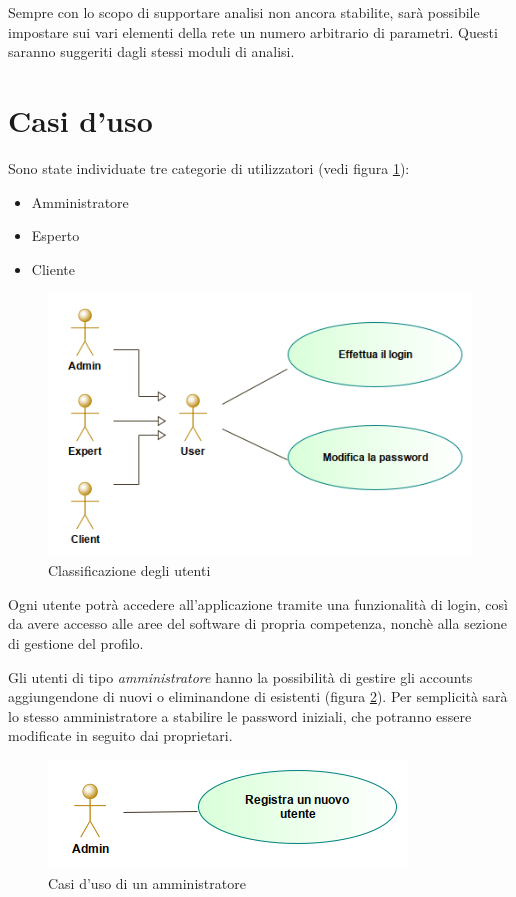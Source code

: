 Sempre con lo scopo di supportare analisi non ancora stabilite, sarà possibile impostare sui vari elementi della rete un numero arbitrario di parametri.
Questi saranno suggeriti dagli stessi moduli di analisi.


\section{Casi d'uso}

Sono state individuate tre categorie di utilizzatori (vedi figura \ref{fig:uc-users}):
\begin{itemize}
	\item Amministratore
	\item Esperto
	\item Cliente
\end{itemize}

\begin{figure}[h]
	\centering
	\includegraphics[scale=0.5]{img/UserUC}
	\caption{Classificazione degli utenti}
	\label{fig:uc-users}
\end{figure}

Ogni utente potrà accedere all'applicazione tramite una funzionalità di login, così da avere accesso alle aree del software di propria competenza, nonchè alla sezione di gestione del profilo.

Gli utenti di tipo \textit{amministratore} hanno la possibilità di gestire gli accounts aggiungendone di nuovi o eliminandone di esistenti (figura \ref{fig:uc-admins}).
Per semplicità sarà lo stesso amministratore a stabilire le password iniziali, che potranno essere modificate in seguito dai proprietari.

\begin{figure}[h]
	\centering
	\includegraphics[scale=0.5]{img/AdminUC}
	\caption{Casi d'uso di un amministratore}
	\label{fig:uc-admins}
\end{figure}

